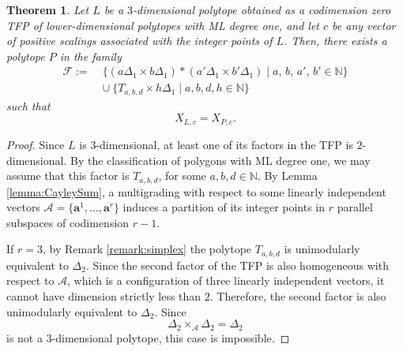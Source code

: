 \documentclass[12pt,reqno]{amsart}   	%
\theoremstyle{plain}
\newtheorem{theorem}{Theorem}[section]
\theoremstyle{definition}
\theoremstyle{remark}
\begin{document}
\begin{theorem}\label{thm:classification}
Let $L$ be a $3$-dimensional polytope obtained as a codimension zero TFP of lower-dimensional polytopes with ML degree one, and let $c$ be any vector of positive scalings associated with the integer points of $L$. Then, there exists a polytope $P$ in the family
    \begin{align*}
    \mathcal{F} := \; & \{ \left( a\Delta_1 \times b\Delta_1\right) * \left( a'\Delta_1 \times b'\Delta_1    \right) \mid a,\,b,\,a',\,b' \in \mathbb{N} \} \\
    & \cup ~ \{T_{a,b,d}\times h\Delta_1 \mid a,b,d,h \in \mathbb{N} \}
    \end{align*}
    such that
    \[
    X_{L,c} = X_{P,c}.
    \]
\end{theorem}
\begin{proof}
    Since $L$ is $3$-dimensional, at least one of its factors in the TFP is $2$-dimensional. By the classification of polygons with ML degree one, we may assume that this factor is $T_{a,b,d}$, for some $a,b,d \in \mathbb{N}$. By Lemma \ref{lemma:CayleySum}, a multigrading with respect to some linearly independent vectors $\mathcal{A} = \{\mathbf{a}^1,\dots,\mathbf{a}^r\}$ induces a partition of its integer points in $r$ parallel subspaces of codimension $r-1$. 
    
    If $r=3$, by Remark \ref{remark:simplex} the polytope $T_{a,b,d}$ is unimodularly equivalent to $\Delta_2$. Since the second factor of the TFP is also homogeneous with respect to $\mathcal{A}$, which is a configuration of three linearly independent vectors, it cannot have dimension strictly less than $2$. Therefore, the second factor is also unimodularly equivalent to $\Delta_2$. Since
    \[
    \Delta_2 \times_{\mathcal{A}} \Delta_2 = \Delta_2
    \]
    is not a $3$-dimensional polytope, this case is impossible.


\end{proof}
\end{document}

